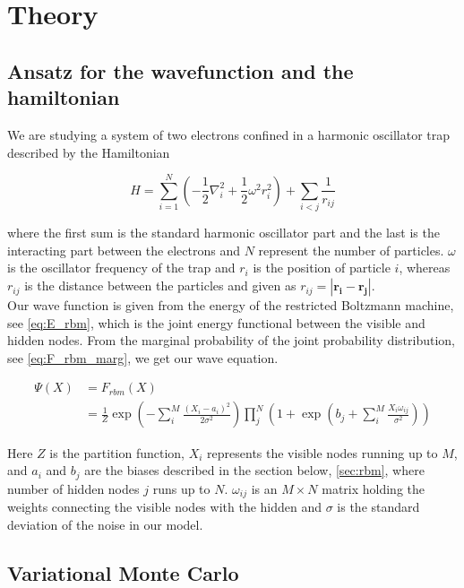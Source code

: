 \section{Theory}

\subsection{Ansatz for the wavefunction and the hamiltonian}

We are studying a system of two electrons confined in a harmonic oscillator trap described by the Hamiltonian 

\begin{equation}
\hat{H} = \sum_{i=1}^N \left( - \frac{1}{2} \nabla_i^2 + \frac{1}{2} \omega^2 r_i^2 \right) + \sum_{i<j} \frac{1}{r_{ij}}
\end{equation}

where the first sum is the standard harmonic oscillator part and the last is the interacting part between the electrons and $N$ represent the number of particles. $\omega$ is the oscillator frequency of the trap and $r_i$ is the position of particle $i$, whereas $r_{ij}$ is the distance between the particles and given as $r_{ij} = |\mathbf{r_i} - \mathbf{r_j}|$. \\
Our wave function is given from the energy of the restricted Boltzmann machine, see \eqref{eq:E_rbm}, which is the joint energy functional between the visible and hidden nodes. From the marginal probability of the joint probability distribution, see \eqref{eq:F_rbm_marg}, we get our wave equation.                     

\begin{align}\label{eq:F_rbm}
\Psi(X) &= F_{rbm}(X) \\
&= \frac{1}{Z} \exp \left( -\sum_{i}^{M} \frac{(X_i - a_i)^2}{2 \sigma^2} \right) \prod_{j}^{N} \left( 1 + \exp \left( b_j + \sum_{i}^{M} \frac{X_i \omega_{ij}}{\sigma^2} \right) \right)
\end{align}

Here $Z$ is the partition function, $X_i$ represents the visible nodes running up to $M$, and $a_i$ and $b_j$ are the biases described in the section below, \eqref{sec:rbm}, where number of hidden nodes $j$ runs up to $N$. $\omega_{ij}$ is an $M \times N$ matrix holding the weights connecting the visible nodes with the hidden and $\sigma$ is the standard deviation of the noise in our model. \\ 

\subsection{Variational Monte Carlo}

